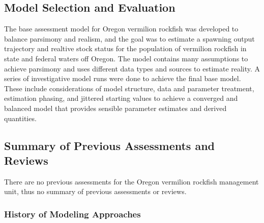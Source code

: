 \documentclass[11pt,
  english,
  a4paper,
]{article}
\begin{document}
\leavevmode\tagmcend\tagstructend\par


\hypertarget{model-selection-and-evaluation}{%
\subsection{Model Selection and Evaluation}\label{model-selection-and-evaluation}}

\leavevmode\tagmcend\tagstructend


The base assessment model for Oregon vermilion rockfish was developed to balance parsimony and realism, and the goal was to estimate a spawning output trajectory and realtive stock status for the population of vermilion rockfish in state and federal waters off Oregon. The model contains many assumptions to achieve parsimony and uses different data types and sources to estimate reality. A series of investigative model runs were done to achieve the final base model. These include considerations of model structure, data and parameter treatment, estimation phasing, and jittered starting values to achieve a converged and balanced model that provides sensible parameter estimates and derived quantities.

\leavevmode\tagmcend\tagstructend\par


\hypertarget{summary-of-previous-assessments-and-reviews}{%
\subsection{Summary of Previous Assessments and Reviews}\label{summary-of-previous-assessments-and-reviews}}

\leavevmode\tagmcend\tagstructend


There are no previous assessments for the Oregon vermilion rockfish management unit, thus no summary of previous assessments or reviews.

\leavevmode\tagmcend\tagstructend\par


\hypertarget{history-of-modeling-approaches}{%
\subsubsection{History of Modeling Approaches}\label{history-of-modeling-approaches}}
\end{document}
